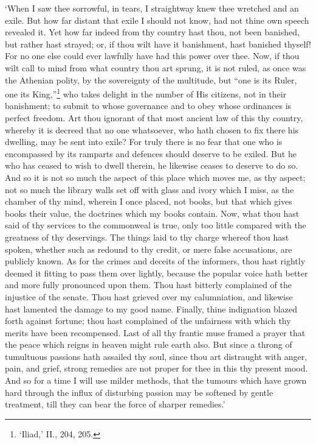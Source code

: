 \documentclass[11pt]{book}
\begin{document}
`When I saw thee sorrowful, in tears, I straightway knew thee wretched
and an exile. But how far distant that exile I should not know, had not
thine own speech revealed it. Yet how far indeed from thy country hast
thou, not been banished, but rather hast strayed; or, if thou wilt have
it banishment, hast banished thyself! For no one else could ever
lawfully have had this power over thee. Now, if thou wilt call to mind
from what country thou art sprung, it is not ruled, as once was the
Athenian polity, by the sovereignty of the multitude, but ``one is its
Ruler, one its King,''\footnote{‘Iliad,’ II., 204, 205.} who takes delight in the number of His citizens,
not in their banishment; to submit to whose governance and to obey
whose ordinances is perfect freedom. Art thou ignorant of that most
ancient law of this thy country, whereby it is decreed that no one
whatsoever, who hath chosen to fix there his dwelling, may be sent into
exile? For truly there is no fear that one who is encompassed by its
ramparts and defences should deserve to be exiled. But he who has ceased
to wish to dwell therein, he likewise ceases to deserve to do so. And so
it is not so much the aspect of this place which moves me, as thy
aspect; not so much the library walls set off with glass and ivory which
I miss, as the chamber of thy mind, wherein I once placed, not books,
but that which gives books their value, the doctrines which my books
contain. Now, what thou hast said of thy services to the commonweal is
true, only too little compared with the greatness of thy deservings. The
things laid to thy charge whereof thou hast spoken, whether such as
redound to thy credit, or mere false accusations, are publicly known. As
for the crimes and deceits of the informers, thou hast rightly deemed
it fitting to pass them over lightly, because the popular voice hath
better and more fully pronounced upon them. Thou hast bitterly
complained of the injustice of the senate. Thou hast grieved over my
calumniation, and likewise hast lamented the damage to my good name.
Finally, thine indignation blazed forth against fortune; thou hast
complained of the unfairness with which thy merits have been
recompensed. Last of all thy frantic muse framed a prayer that the peace
which reigns in heaven might rule earth also. But since a throng of
tumultuous passions hath assailed thy soul, since thou art distraught
with anger, pain, and grief, strong remedies are not proper for thee in
this thy pres\-ent mood. And so for a time I will use milder methods, that
the tumours which have grown hard through the influx of disturbing
passion may be softened by gentle treatment, till they can bear the
force of sharper remedies.'
\end{document}
